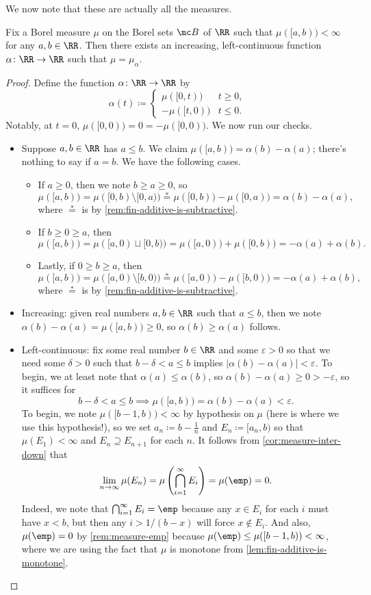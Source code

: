 \documentclass[../notes.tex]{subfiles}
\begin{document}
We now note that these are actually all the measures.
\begin{proposition}
	Fix a Borel measure $\mu$ on the Borel sets $\mc B$ of $\RR$ such that $\mu([a,b))<\infty$ for any $a,b\in\RR$. Then there exists an increasing, left-continuous function $\alpha\colon\RR\to\RR$ such that $\mu=\mu_\alpha$.
\end{proposition}
\begin{proof}
	Define the function $\alpha\colon\RR\to\RR$ by
	\[\alpha(t)\coloneqq\begin{cases}
		\mu([0,t)) & t\ge0, \\
		-\mu([t,0)) & t\le0.
	\end{cases}\]
	Notably, at $t=0$, $\mu([0,0))=0=-\mu([0,0))$. We now run our checks.
	\begin{itemize}
		\item Suppose $a,b\in\RR$ has $a\le b$. We claim $\mu([a,b))=\alpha(b)-\alpha(a)$; there's nothing to say if $a=b$. We have the following cases.
		\begin{itemize}
			\item If $a\ge0$, then we note $b\ge a\ge0$, so
			\[\mu([a,b))=\mu([0,b)\setminus[0,a))\stackrel*=\mu([0,b))-\mu([0,a))=\alpha(b)-\alpha(a),\]
			where $\stackrel*=$ is by \autoref{rem:fin-additive-is-subtractive}.
			\item If $b\ge0\ge a$, then
			\[\mu([a,b))=\mu([a,0)\sqcup[0,b))=\mu([a,0))+\mu([0,b))=-\alpha(a)+\alpha(b).\]
			\item Lastly, if $0\ge b\ge a$, then
			\[\mu([a,b))=\mu([a,0)\setminus[b,0))\stackrel*=\mu([a,0))-\mu([b,0))=-\alpha(a)+\alpha(b),\]
			where $\stackrel*=$ is by \autoref{rem:fin-additive-is-subtractive}.
		\end{itemize}
		\item Increasing: given real numbers $a,b\in\RR$ such that $a\le b$, then we note $\alpha(b)-\alpha(a)=\mu([a,b))\ge0$, so $\alpha(b)\ge\alpha(a)$ follows.
		\item Left-continuous: fix some real number $b\in\RR$ and some $\varepsilon>0$ so that we need some $\delta>0$ such that $b-\delta<a\le b$ implies $|\alpha(b)-\alpha(a)|<\varepsilon$. To begin, we at least note that $\alpha(a)\le\alpha(b)$, so $\alpha(b)-\alpha(a)\ge0>-\varepsilon$, so it suffices for
		\[b-\delta<a\le b\implies\mu([a,b))=\alpha(b)-\alpha(a)<\varepsilon.\]
		To begin, we note $\mu([b-1,b))<\infty$ by hypothesis on $\mu$ (here is where we use this hypothesis!), so we set $a_n\coloneqq b-\frac1n$ and $E_n\coloneqq[a_n,b)$ so that $\mu(E_1)<\infty$ and $E_n\supseteq E_{n+1}$ for each $n$. It follows from \autoref{cor:measure-inter-down} that
		\[\lim_{n\to\infty}\mu(E_n)=\mu\left(\bigcap_{i=1}^\infty E_i\right)=\mu(\emp)=0.\]
		Indeed, we note that $\bigcap_{i=1}^\infty E_i=\emp$ because any $x\in E_i$ for each $i$ must have $x<b$, but then any $i>1/(b-x)$ will force $x\notin E_i$. And also, $\mu(\emp)=0$ by \autoref{rem:measure-emp} because $\mu(\emp)\le\mu([b-1,b))<\infty$, where we are using the fact that $\mu$ is monotone from \autoref{lem:fin-additive-is-monotone}.


\end{itemize}
\end{proof}
\end{document}
